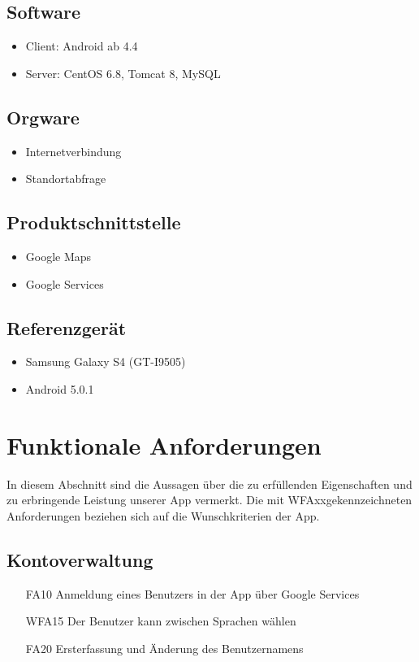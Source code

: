 \documentclass{scrartcl}
\begin{document}
	\subsection{Software}
	\begin{itemize}	        
		\item \gls{Client}: \gls{Android} ab 4.4
		\item \gls{Server}: CentOS 6.8, \gls{Tomcat} 8, MySQL
	\end{itemize}	
	\subsection{Orgware}
	\begin{itemize}	        
		\item Internetverbindung
		\item Standortabfrage
	\end{itemize}
	\subsection{Produktschnittstelle}
	\begin{itemize}	        
		\item Google Maps
		\item Google Services
	\end{itemize}
	\subsection{Referenzgerät}
	\begin{itemize}
		\item Samsung Galaxy S4 (GT-I9505)
		\item \gls{Android} 5.0.1
	\end{itemize}
	\newpage
	
	
	\section{Funktionale Anforderungen}

	\renewcommand{\labelitemii}{$\bullet$}
	 In diesem Abschnitt sind die Aussagen über die zu erfüllenden Eigenschaften und zu erbringende Leistung unserer App vermerkt. Die mit \glqq WFAxx\grqq gekennzeichneten Anforderungen beziehen sich auf die Wunschkriterien der App.
	 
	\subsection{Kontoverwaltung}
	\begin{itemize}
		\item[FA10] Anmeldung eines Benutzers in der App über \gls{Google Services}
		\item[WFA15] Der Benutzer kann zwischen Sprachen wählen
		\item[FA20] Ersterfassung und Änderung des Benutzernamens
		
	\end{itemize}
	
\end{document}
